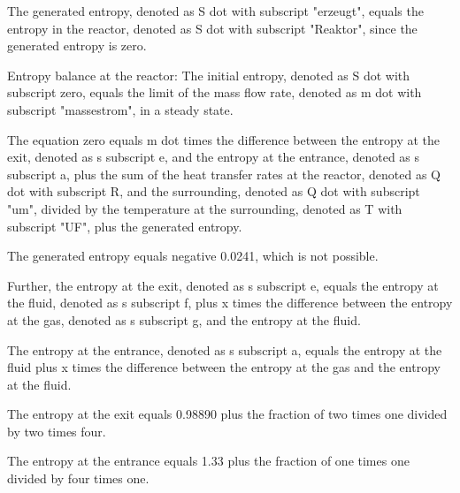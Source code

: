 The generated entropy, denoted as S dot with subscript "erzeugt", equals the entropy in the reactor, denoted as S dot with subscript "Reaktor", since the generated entropy is zero.

Entropy balance at the reactor:
The initial entropy, denoted as S dot with subscript zero, equals the limit of the mass flow rate, denoted as m dot with subscript "massestrom", in a steady state.

The equation zero equals m dot times the difference between the entropy at the exit, denoted as s subscript e, and the entropy at the entrance, denoted as s subscript a, plus the sum of the heat transfer rates at the reactor, denoted as Q dot with subscript R, and the surrounding, denoted as Q dot with subscript "um", divided by the temperature at the surrounding, denoted as T with subscript "UF", plus the generated entropy.

The generated entropy equals negative 0.0241, which is not possible.

Further, the entropy at the exit, denoted as s subscript e, equals the entropy at the fluid, denoted as s subscript f, plus x times the difference between the entropy at the gas, denoted as s subscript g, and the entropy at the fluid.

The entropy at the entrance, denoted as s subscript a, equals the entropy at the fluid plus x times the difference between the entropy at the gas and the entropy at the fluid.

The entropy at the exit equals 0.98890 plus the fraction of two times one divided by two times four.

The entropy at the entrance equals 1.33 plus the fraction of one times one divided by four times one.